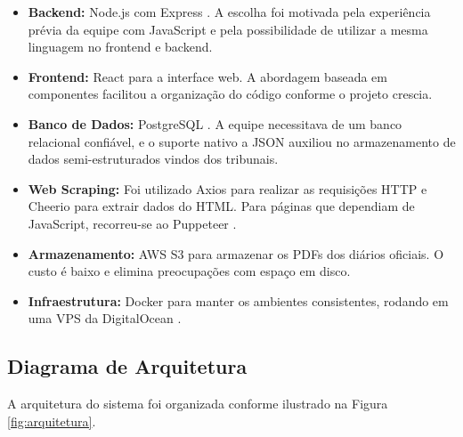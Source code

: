 \documentclass[
	12pt,
	oneside,
	a4paper,
	brazil,
	sumario=tradicional
]{abntex2}
\begin{document}
\begin{itemize}
    \item \textbf{Backend:} Node.js \cite{nodejs_docs} com Express \cite{express_docs}. A escolha foi motivada pela experiência prévia da equipe com JavaScript e pela possibilidade de utilizar a mesma linguagem no frontend e backend.

    \item \textbf{Frontend:} React \cite{react_docs} para a interface web. A abordagem baseada em componentes facilitou a organização do código conforme o projeto crescia.

    \item \textbf{Banco de Dados:} PostgreSQL \cite{postgresql_docs}. A equipe necessitava de um banco relacional confiável, e o suporte nativo a JSON auxiliou no armazenamento de dados semi-estruturados vindos dos tribunais.

    \item \textbf{Web Scraping:} Foi utilizado Axios \cite{axios_docs} para realizar as requisições HTTP e Cheerio \cite{cheerio_docs} para extrair dados do HTML. Para páginas que dependiam de JavaScript, recorreu-se ao Puppeteer \cite{puppeteer_docs}.

    \item \textbf{Armazenamento:} AWS S3 \cite{aws_s3_docs} para armazenar os PDFs dos diários oficiais. O custo é baixo e elimina preocupações com espaço em disco.

    \item \textbf{Infraestrutura:} Docker \cite{docker_docs} para manter os ambientes consistentes, rodando em uma VPS da DigitalOcean \cite{digitalocean_docs}.
\end{itemize}

\subsection{Diagrama de Arquitetura}

A arquitetura do sistema foi organizada conforme ilustrado na Figura \ref{fig:arquitetura}.
\end{document}
